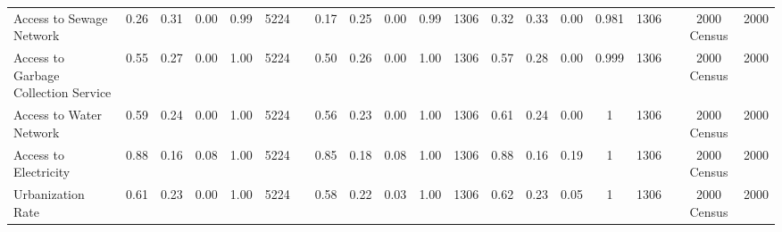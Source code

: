 \begin{sidewaystable}
\begin{table}[H]
\begin{footnotesize}
\begin{center}
{\begin{threeparttable}[b]
\begin{tabular}{rrrrrrrrrrrrrrrrrrrr}
    \multicolumn{1}{l}{Access to Sewage Network} & \multicolumn{1}{c}{0.26} & \multicolumn{1}{c}{0.31} & \multicolumn{1}{c}{0.00} & \multicolumn{1}{c}{0.99} & \multicolumn{1}{c}{5224} &       & \multicolumn{1}{c}{0.17} & \multicolumn{1}{c}{0.25} & \multicolumn{1}{c}{0.00} & \multicolumn{1}{c}{0.99} & \multicolumn{1}{c}{1306} & \multicolumn{1}{c}{0.32} & \multicolumn{1}{c}{0.33} & \multicolumn{1}{c}{0.00} & \multicolumn{1}{c}{0.981} & \multicolumn{1}{c}{1306} &       & \multicolumn{1}{c}{2000 Census} & \multicolumn{1}{c}{2000} \\
    \multicolumn{1}{l}{Access to Garbage Collection Service} & \multicolumn{1}{c}{0.55} & \multicolumn{1}{c}{0.27} & \multicolumn{1}{c}{0.00} & \multicolumn{1}{c}{1.00} & \multicolumn{1}{c}{5224} &       & \multicolumn{1}{c}{0.50} & \multicolumn{1}{c}{0.26} & \multicolumn{1}{c}{0.00} & \multicolumn{1}{c}{1.00} & \multicolumn{1}{c}{1306} & \multicolumn{1}{c}{0.57} & \multicolumn{1}{c}{0.28} & \multicolumn{1}{c}{0.00} & \multicolumn{1}{c}{0.999} & \multicolumn{1}{c}{1306} &       & \multicolumn{1}{c}{2000 Census} & \multicolumn{1}{c}{2000} \\
    \multicolumn{1}{l}{Access to Water Network} & \multicolumn{1}{c}{0.59} & \multicolumn{1}{c}{0.24} & \multicolumn{1}{c}{0.00} & \multicolumn{1}{c}{1.00} & \multicolumn{1}{c}{5224} &       & \multicolumn{1}{c}{0.56} & \multicolumn{1}{c}{0.23} & \multicolumn{1}{c}{0.00} & \multicolumn{1}{c}{1.00} & \multicolumn{1}{c}{1306} & \multicolumn{1}{c}{0.61} & \multicolumn{1}{c}{0.24} & \multicolumn{1}{c}{0.00} & \multicolumn{1}{c}{1} & \multicolumn{1}{c}{1306} &       & \multicolumn{1}{c}{2000 Census} & \multicolumn{1}{c}{2000} \\
    \multicolumn{1}{l}{Access to Electricity} & \multicolumn{1}{c}{0.88} & \multicolumn{1}{c}{0.16} & \multicolumn{1}{c}{0.08} & \multicolumn{1}{c}{1.00} & \multicolumn{1}{c}{5224} &       & \multicolumn{1}{c}{0.85} & \multicolumn{1}{c}{0.18} & \multicolumn{1}{c}{0.08} & \multicolumn{1}{c}{1.00} & \multicolumn{1}{c}{1306} & \multicolumn{1}{c}{0.88} & \multicolumn{1}{c}{0.16} & \multicolumn{1}{c}{0.19} & \multicolumn{1}{c}{1} & \multicolumn{1}{c}{1306} &       & \multicolumn{1}{c}{2000 Census} & \multicolumn{1}{c}{2000} \\
    \multicolumn{1}{l}{Urbanization Rate} & \multicolumn{1}{c}{0.61} & \multicolumn{1}{c}{0.23} & \multicolumn{1}{c}{0.00} & \multicolumn{1}{c}{1.00} & \multicolumn{1}{c}{5224} &       & \multicolumn{1}{c}{0.58} & \multicolumn{1}{c}{0.22} & \multicolumn{1}{c}{0.03} & \multicolumn{1}{c}{1.00} & \multicolumn{1}{c}{1306} & \multicolumn{1}{c}{0.62} & \multicolumn{1}{c}{0.23} & \multicolumn{1}{c}{0.05} & \multicolumn{1}{c}{1} & \multicolumn{1}{c}{1306} &       & \multicolumn{1}{c}{2000 Census} & \multicolumn{1}{c}{2000} \\

\end{tabular}
\end{threeparttable}}
\end{center}
\end{footnotesize}
\end{table}
\end{sidewaystable}

